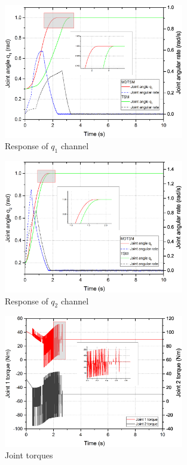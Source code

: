 \documentclass[3p]{elsarticle}
\theoremstyle{plain}
\theoremstyle{remark}
\begin{document}
\begin{figure}
\centering
\includegraphics[width=0.7\textwidth]{paper3_fig4.eps}
\caption{Response of $q_1$ channel}
\label{Figure:4}
\end{figure}

\begin{figure}
\centering
\includegraphics[width=0.7\textwidth]{paper3_fig5.eps}
\caption{Response of $q_2$ channel}
\label{Figure:5}
\end{figure}

\begin{figure}
\centering
\includegraphics[width=0.7\textwidth]{paper3_torque.eps}
\caption{Joint torques}
\label{Figure:torque}
\end{figure}
\end{document}
